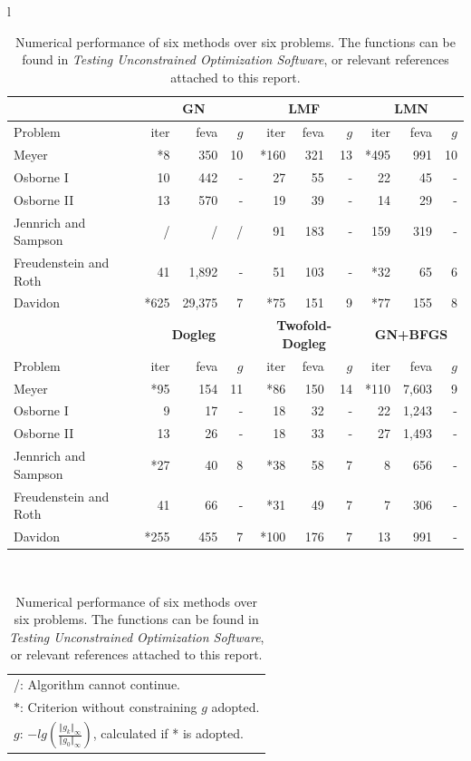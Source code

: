 \documentclass[11pt,a4paper]{article}
\begin{document}
\begin{table}
\label{tab3}
\centering
\begin{tabular}{l}
\begin{tabular}{l|rrr|rrr|rrr}
\hline
 &
\multicolumn{3}{|c}{\textbf{GN}} &
\multicolumn{3}{c}{\textbf{LMF}} &
\multicolumn{3}{c}{\textbf{LMN}} \\
\hline
Problem &
iter & feva & $g$ &
iter & feva & $g$ &
iter & feva & $g$ \\
\hline
Meyer & *8 & 350 & 10 & *160 & 321 & 13 & *495 & 991 & 10 \\
Osborne I & 10 & 442 & - & 27 & 55 & - & 22 & 45 & - \\
Osborne II & 13 & 570 & - & 19 & 39 & - & 14 & 29 & - \\
Jennrich and Sampson & / & / & / & 91 & 183 & - & 159 & 319 & - \\
Freudenstein and Roth & 41 & 1,892 & - & 51 & 103 & - & *32 & 65 & 6 \\
Davidon & *625 & 29,375 & 7 & *75 & 151 & 9 & *77 & 155 & 8 \\
\hline
 &
\multicolumn{3}{|c}{\textbf{Dogleg}} & \multicolumn{3}{c}{\textbf{Twofold-Dogleg}} & \multicolumn{3}{c}{\textbf{GN+BFGS}} \\
\hline
Problem &
iter & feva & $g$ &
iter & feva & $g$ &
iter & feva & $g$ \\
\hline
Meyer & *95 & 154 & 11 & *86 & 150 & 14 & *110 & 7,603 & 9 \\
Osborne I & 9 & 17 & - & 18 & 32 & - & 22 & 1,243 & - \\
Osborne II & 13 & 26 & - & 18 & 33 & - & 27 & 1,493 & - \\
Jennrich and Sampson & *27 & 40 & 8 & *38 & 58 & 7 & 8 & 656 & - \\
Freudenstein and Roth & 41 & 66 & - & *31 & 49 & 7 & 7 & 306 & - \\
Davidon & *255 & 455 & 7 & *100 & 176 & 7 & 13 & 991 & - \\
\hline
\end{tabular} \\
\begin{tabular}{l}
  /: Algorithm cannot continue. \\
  $*$: Criterion without constraining $g$ adopted. \\
  $g$: $-lg(\frac{\Vert g_k \Vert_{\infty}}{\Vert g_0 \Vert_{\infty}})$, calculated if * is adopted.
\end{tabular}
\end{tabular}
\caption{Numerical performance of six methods over six problems. The functions can be found in \textit{Testing Unconstrained Optimization Software}, or relevant references attached to this report.}
\end{table}
\end{document}
